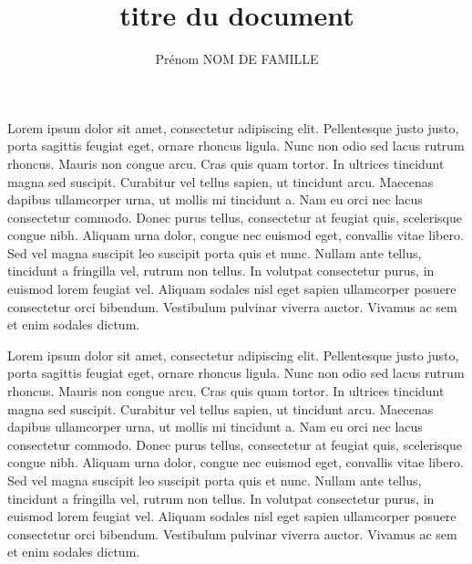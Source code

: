 \documentclass[letterpaper, twoside, 12pt,these,creativecommons,hyperref]{thETS}
\title{titre du document}
\author{Prénom NOM DE FAMILLE}
\begin{document}

\maketitle

\presentjury

\begin{avantpropos}
Lorem ipsum dolor sit amet, consectetur adipiscing elit. Pellentesque justo justo, porta sagittis feugiat eget, ornare rhoncus ligula. Nunc non odio sed lacus rutrum rhoncus. Mauris non congue arcu. Cras quis quam tortor. In ultrices tincidunt magna sed suscipit. Curabitur vel tellus sapien, ut tincidunt arcu. Maecenas dapibus ullamcorper urna, ut mollis mi tincidunt a. Nam eu orci nec lacus consectetur commodo. Donec purus tellus, consectetur at feugiat quis, scelerisque congue nibh. Aliquam urna dolor, congue nec euismod eget, convallis vitae libero. Sed vel magna suscipit leo suscipit porta quis et nunc. Nullam ante tellus, tincidunt a fringilla vel, rutrum non tellus. In volutpat consectetur purus, in euismod lorem feugiat vel. Aliquam sodales nisl eget sapien ullamcorper posuere consectetur orci bibendum. Vestibulum pulvinar viverra auctor. Vivamus ac sem et enim sodales dictum.
\end{avantpropos}

\begin{remerciements}
Lorem ipsum dolor sit amet, consectetur adipiscing elit. Pellentesque justo justo, porta sagittis feugiat eget, ornare rhoncus ligula. Nunc non odio sed lacus rutrum rhoncus. Mauris non congue arcu. Cras quis quam tortor. In ultrices tincidunt magna sed suscipit. Curabitur vel tellus sapien, ut tincidunt arcu. Maecenas dapibus ullamcorper urna, ut mollis mi tincidunt a. Nam eu orci nec lacus consectetur commodo. Donec purus tellus, consectetur at feugiat quis, scelerisque congue nibh. Aliquam urna dolor, congue nec euismod eget, convallis vitae libero. Sed vel magna suscipit leo suscipit porta quis et nunc. Nullam ante tellus, tincidunt a fringilla vel, rutrum non tellus. In volutpat consectetur purus, in euismod lorem feugiat vel. Aliquam sodales nisl eget sapien ullamcorper posuere consectetur orci bibendum. Vestibulum pulvinar viverra auctor. Vivamus ac sem et enim sodales dictum.
\end{remerciements}
\end{document}
